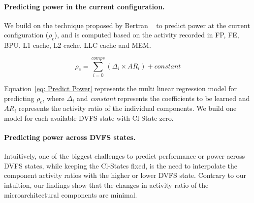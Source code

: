 \paragraph{Predicting power in the current configuration.} We build on the technique
proposed by Bertran \etal~\citep{10.1109/TC.2012.97} to predict power at the current
configuration ($\rho_\mathit{c}$), and is computed based on the activity recorded in
FP, FE, BPU, L1 cache, L2 cache, LLC cache and MEM.

\begin{equation}
\label{eq: Predict Power}
    \rho_{\mathit{c}} = \sum_{i=0}^{comps}(\Delta_{\mathit{i}} \times AR_{\mathit{i}}) + constant
\end{equation} 



 Equation~\ref{eq: Predict Power} represents the multi linear regression model for
predicting $\rho_\mathit{c}$,  where $\Delta_\mathit{i}$ and \textit{constant}
represents the coefficients to be learned and \textit{$AR_\mathit{i}$} represents
the activity ratio of the individual components. We build one model for each available
DVFS state with Cl-State zero.%

\paragraph{Predicting power across DVFS states.} Intuitively, one of the biggest
challenges to predict performance or power across DVFS states, while keeping the Cl-States
fixed, is the need to interpolate the component activity ratios with the higher or lower
DVFS state.  Contrary to our intuition, our findings show that the changes in activity ratio
of the microarchitectural components are minimal. 

